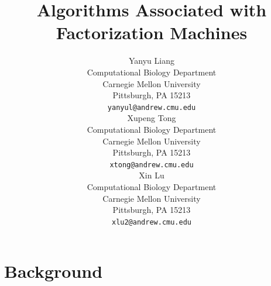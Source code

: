 \documentclass{article}
\title{Algorithms Associated with Factorization Machines}
\author{
  Yanyu Liang \\
  Computational Biology Department\\
  Carnegie Mellon University\\
  Pittsburgh, PA 15213 \\
  \texttt{yanyul@andrew.cmu.edu} \\
  \And
  Xupeng Tong \\
  Computational Biology Department\\
  Carnegie Mellon University\\
  Pittsburgh, PA 15213 \\
  \texttt{xtong@andrew.cmu.edu} \\
  \AND
  Xin Lu \\
  Computational Biology Department\\
  Carnegie Mellon University\\
  Pittsburgh, PA 15213 \\
  \texttt{xlu2@andrew.cmu.edu} \\
}
\begin{document}

\maketitle


\section{Background}
\end{document}

